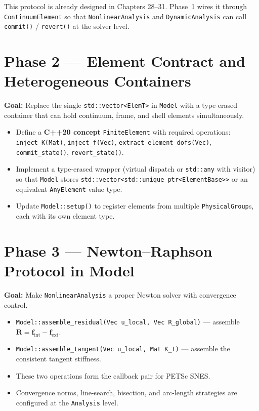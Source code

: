 This protocol is already designed in Chapters 28--31.  Phase~1 wires it
through \texttt{ContinuumElement} so that \texttt{NonlinearAnalysis} and
\texttt{DynamicAnalysis} can call \texttt{commit()} / \texttt{revert()}
at the solver level.

\section{Phase 2 — Element Contract and Heterogeneous Containers}
\label{sec:phase2-overview}

\textbf{Goal:} Replace the single \texttt{std::vector<ElemT>} in
\texttt{Model} with a type-erased container that can hold continuum,
frame, and shell elements simultaneously.

\begin{itemize}
  \item Define a \textbf{C++20 concept} \texttt{FiniteElement} with
        required operations:
        \texttt{inject\_K(Mat)}, \texttt{inject\_f(Vec)},
        \texttt{extract\_element\_dofs(Vec)},
        \texttt{commit\_state()}, \texttt{revert\_state()}.
  \item Implement a type-erased wrapper (virtual dispatch or
        \texttt{std::any} with visitor) so that
        \texttt{Model} stores
        \texttt{std::vector<std::unique\_ptr<ElementBase>>} or an
        equivalent \texttt{AnyElement} value type.
  \item Update \texttt{Model::setup()} to register elements from
        multiple \texttt{PhysicalGroup}s, each with its own element
        type.
\end{itemize}

\section{Phase 3 — Newton--Raphson Protocol in Model}
\label{sec:phase3-overview}

\textbf{Goal:} Make \texttt{NonlinearAnalysis} a proper Newton solver
with convergence control.

\begin{itemize}
  \item \texttt{Model::assemble\_residual(Vec u\_local, Vec R\_global)}
        --- assemble $\mathbf{R} = \mathbf{f}_{\mathrm{int}} -
        \mathbf{f}_{\mathrm{ext}}$.
  \item \texttt{Model::assemble\_tangent(Vec u\_local, Mat K\_t)}
        --- assemble the consistent tangent stiffness.
  \item These two operations form the callback pair for PETSc SNES.
  \item Convergence norms, line-search, bisection, and arc-length
        strategies are configured at the \texttt{Analysis} level.
\end{itemize}

